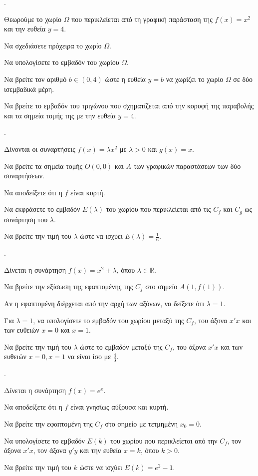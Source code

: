 \documentclass[11pt,a4paper,twocolumn]{article}
\newcounter{askhsh}
\newcommand{\askhsh}{\large\theaskhsh.\ \addtocounter{askhsh}{1}}
\begin{document}
\askhsh Θεωρούμε το χωρίο $\Omega$ που περικλείεται από τη γραφική παράσταση της $f(x)=x^2$ και την ευθεία $y=4$.
\begin{alist}
\item Να σχεδιάσετε πρόχειρα το χωρίο $\Omega$.
\item Να υπολογίσετε το εμβαδόν του χωρίου $\Omega$.
\item Να βρείτε τον αριθμό $b \in (0, 4)$ ώστε η ευθεία $y=b$ να χωρίζει το χωρίο $\Omega$ σε δύο ισεμβαδικά μέρη.
\item Να βρείτε το εμβαδόν του τριγώνου που σχηματίζεται από την κορυφή της παραβολής και τα σημεία τομής της με την ευθεία $y=4$.
\end{alist}

\askhsh Δίνονται οι συναρτήσεις $f(x)=\lambda x^2$ με $\lambda > 0$ και $g(x)=x$.
\begin{alist}
\item Να βρείτε τα σημεία τομής $O(0,0)$ και $A$ των γραφικών παραστάσεων των δύο συναρτήσεων.
\item Να αποδείξετε ότι η $f$ είναι κυρτή.
\item Να εκφράσετε το εμβαδόν $E(\lambda)$ του χωρίου που περικλείεται από τις $C_f$ και $C_g$ ως συνάρτηση του $\lambda$.
\item Να βρείτε την τιμή του $\lambda$ ώστε να ισχύει $E(\lambda)=\frac{1}{6}$.
\end{alist}

\askhsh Δίνεται η συνάρτηση $f(x)=x^2+\lambda$, όπου $\lambda \in \mathbb{R}$.
\begin{alist}
\item Να βρείτε την εξίσωση της εφαπτομένης της $C_f$ στο σημείο $A(1, f(1))$.
\item Αν η εφαπτομένη διέρχεται από την αρχή των αξόνων, να δείξετε ότι $\lambda=1$.
\item Για $\lambda=1$, να υπολογίσετε το εμβαδόν του χωρίου μεταξύ της $C_f$, του άξονα $x'x$ και των ευθειών $x=0$ και $x=1$.
\item Να βρείτε την τιμή του $\lambda$ ώστε το εμβαδόν μεταξύ της $C_f$, του άξονα $x'x$ και των ευθειών $x=0, x=1$ να είναι ίσο με $\frac{4}{3}$.
\end{alist}

\askhsh Δίνεται η συνάρτηση $f(x)=e^x$.
\begin{alist}
\item Να αποδείξετε ότι η $f$ είναι γνησίως αύξουσα και κυρτή.
\item Να βρείτε την εφαπτομένη της $C_f$ στο σημείο με τετμημένη $x_0=0$.
\item Να υπολογίσετε το εμβαδόν $E(k)$ του χωρίου που περικλείεται από την $C_f$, τον άξονα $x'x$, τον άξονα $y'y$ και την ευθεία $x=k$, όπου $k>0$.
\item Να βρείτε την τιμή του $k$ ώστε να ισχύει $E(k) = e^2-1$.
\end{alist}
\end{document}
